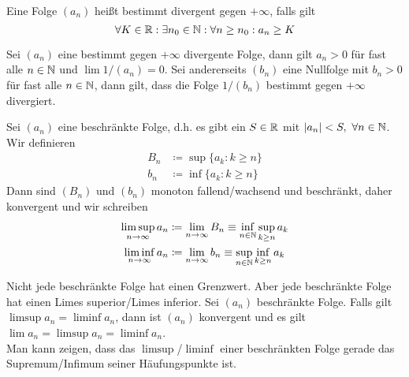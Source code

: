 \begin{defn}
    Eine Folge $(a_n)$ heißt bestimmt divergent gegen $+\infty$, falls gilt 
    \[
        \forall K \in \mathbb{R} :\exists n_0 \in \mathbb{N}: \forall n\ge n_0 : a_n \ge K
    \]
\end{defn}
Sei $(a_n)$ eine bestimmt gegen $+\infty$ divergente Folge, dann gilt $a_n >0$ für fast alle 
$n\in \mathbb{N}$ und $\lim 1/(a_n) = 0$. Sei andererseits $(b_n)$ eine Nullfolge mit $b_n>0$ für fast alle $n\in \mathbb{N}$, dann 
gilt, dass die Folge $1/(b_n)$ bestimmt gegen $+\infty$ divergiert.  
\begin{defn}
    Sei $(a_n)$ eine beschränkte Folge, d.h. es gibt ein $S\in \mathbb{R}$ mit $\vert a_n\vert < S, \ \forall n\in \N$. Wir definieren
    \begin{align*}
        B_n &\coloneqq \sup\{a_k : k\ge n\} \\
        b_n &\coloneqq \inf\{a_k : k \ge n\}
    \end{align*}
    Dann sind $(B_n)$ und $(b_n)$ monoton fallend/wachsend und beschränkt, daher konvergent und wir schreiben 
    \begin{align*}
        \limsup_{n\to\infty} a_n &\coloneqq \lim_{n\to \infty} B_n \equiv \inf_{n\in \mathbb{N}} \sup_{k\ge n} a_k \\
        \liminf_{n\to \infty} a_n &\coloneqq \lim_{n\to\infty} b_n \equiv \sup_{n\in \mathbb{N}} \inf_{k\ge n} a_k
    \end{align*}
\end{defn}
Nicht jede beschränkte Folge hat einen Grenzwert. Aber jede beschränkte Folge hat einen Limes superior/Limes inferior. 
Sei $(a_n)$ beschränkte Folge. Falls gilt $\limsup a_n = \liminf a_n$, dann ist $(a_n)$ konvergent und es gilt $\lim a_n = \limsup a_n = \liminf a_n$. \\
Man kann zeigen, dass das $\limsup$/$\liminf$ einer beschränkten Folge gerade das Supremum/Infimum seiner Häufungspunkte ist.